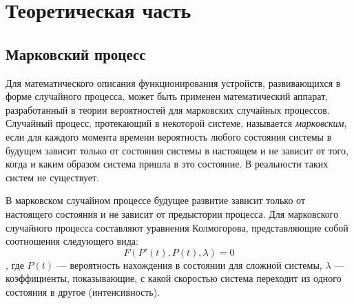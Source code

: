 \chapter{Теоретическая часть}

\section{Марковский процесс}

Для математического описания функционирования устройств, развивающихся в форме случайного процесса, может быть применен математический аппарат, разработанный в теории вероятностей для марковских случайных процессов.
Случайный процесс, протекающий в некоторой системе, называется \textit{марковским}, если для каждого момента времени вероятность любого состояния системы в будущем зависит только от состояния системы в настоящем и не зависит от того, когда и каким образом система пришла в это состояние.
В реальности таких систем не существует.

В марковском случайном процессе будущее развитие зависит только от настоящего состояния и не зависит от предыстории процесса.
Для марковского случайного процесса составляют уравнения Колмогорова, представляющие собой соотношения следующего вида:
\begin{equation}
	F(P'(t), P(t), \lambda) = 0
\end{equation}
, где $P(t)$ --- вероятность нахождения в состоянии для сложной системы,
$\lambda$ --- коэффициенты, показывающие, с какой скоростью система переходит из одного состояния в другое (интенсивность).
